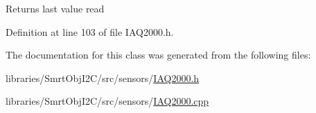 \begin{DoxyReturn}{Returns}
last value read 
\end{DoxyReturn}


Definition at line 103 of file I\+A\+Q2000.\+h.



The documentation for this class was generated from the following files\+:\begin{DoxyCompactItemize}
\item 
libraries/\+Smrt\+Obj\+I2\+C/src/sensors/\hyperlink{_i_a_q2000_8h}{I\+A\+Q2000.\+h}\item 
libraries/\+Smrt\+Obj\+I2\+C/src/sensors/\hyperlink{_i_a_q2000_8cpp}{I\+A\+Q2000.\+cpp}\end{DoxyCompactItemize}
